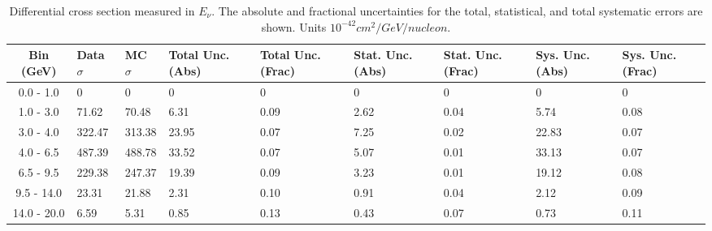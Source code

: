 \begin{table}[!htb]
    \centering
    \tiny
    \begin{tabular}{|c|p{0.5in}|p{0.5in}|p{0.5in}|p{0.5in}|p{0.5in}|p{0.5in}|p{0.5in}|p{0.5in}|}
        \hline
        Bin (GeV)& Data $\sigma$ & MC $\sigma$ & Total Unc. (Abs) & Total Unc. (Frac)  & Stat. Unc. (Abs) & Stat. Unc. (Frac) & Sys. Unc. (Abs) & Sys. Unc. (Frac)\\ \hline
0.0 - 1.0 & 0 & 0 & 0 & 0 & 0 & 0 & 0 & 0\\ \hline
1.0 - 3.0 & 71.62 & 70.48 & 6.31 & 0.09 & 2.62 & 0.04 & 5.74 & 0.08\\ \hline
3.0 - 4.0 & 322.47 & 313.38 & 23.95 & 0.07 & 7.25 & 0.02 & 22.83 & 0.07\\ \hline
4.0 - 6.5 & 487.39 & 488.78 & 33.52 & 0.07 & 5.07 & 0.01 & 33.13 & 0.07\\ \hline
6.5 - 9.5 & 229.38 & 247.37 & 19.39 & 0.09 & 3.23 & 0.01 & 19.12 & 0.08\\ \hline
9.5 - 14.0 & 23.31 & 21.88 & 2.31 & 0.10 & 0.91 & 0.04 & 2.12 & 0.09\\ \hline
14.0 - 20.0 & 6.59 & 5.31 & 0.85 & 0.13 & 0.43 & 0.07 & 0.73 & 0.11\\ \hline


    \end{tabular}
    \caption{Differential cross section measured in $E_\nu$. The absolute and fractional uncertainties for the total, statistical, and total systematic errors are shown. Units $10^{-42}cm^2/GeV/nucleon$.}
    \label{tab:ApdxA:XSecTable1DEnu}
\end{table}

